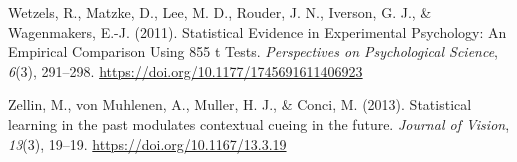 \documentclass[
  man,
  floatsintext,
  longtable,
  nolmodern,
  notxfonts,
  notimes,
  colorlinks=true,linkcolor=blue,citecolor=blue,urlcolor=blue]{apa7}
\newlength{\cslhangindent}
\newenvironment{CSLReferences}[2] %
 {\begin{list}{}{%
  \setlength{\itemindent}{0pt}
  \setlength{\leftmargin}{0pt}
  \setlength{\parsep}{0pt}
  \ifodd #1
   \setlength{\leftmargin}{\cslhangindent}
   \setlength{\itemindent}{-1\cslhangindent}
  \fi
  \setlength{\itemsep}{#2\baselineskip}}}
 {\end{list}}
\begin{document}
\begin{CSLReferences}{1}{0}
Wetzels, R., Matzke, D., Lee, M. D., Rouder, J. N., Iverson, G. J., \&
Wagenmakers, E.-J. (2011). Statistical {Evidence} in {Experimental
Psychology}: {An Empirical Comparison Using} 855 t {Tests}.
\emph{Perspectives on Psychological Science}, \emph{6}(3), 291--298.
\url{https://doi.org/10.1177/1745691611406923}

Zellin, M., von Muhlenen, A., Muller, H. J., \& Conci, M. (2013).
Statistical learning in the past modulates contextual cueing in the
future. \emph{Journal of Vision}, \emph{13}(3), 19--19.
\url{https://doi.org/10.1167/13.3.19}

\end{CSLReferences}
\end{document}
